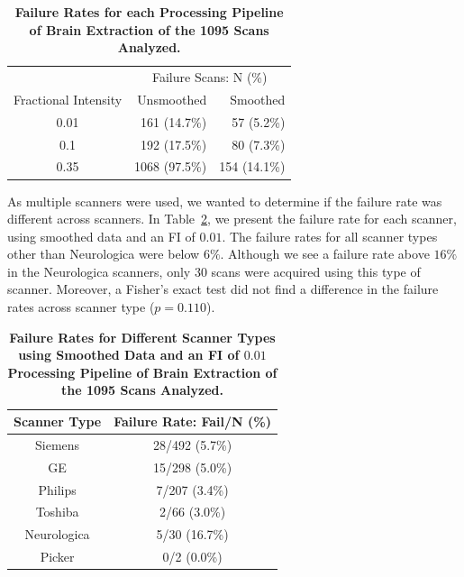 \documentclass{elsarticle}\usepackage[]{graphicx}\usepackage[]{color}
\begin{document}
\begin{table}[ht]
\centering
\begin{tabular}{cr|r}
  \hline & \multicolumn{2}{c}{Failure Scans: N (\%)} \\Fractional Intensity & Unsmoothed & Smoothed \\ 
  \hline
0.01 & 161 (14.7\%) & 57 (5.2\%) \\ 
  0.1 & 192 (17.5\%) & 80 (7.3\%) \\ 
  0.35 & 1068 (97.5\%) & 154 (14.1\%) \\ 
   \hline
\end{tabular}
\caption{{\bf Failure Rates for each Processing Pipeline of Brain Extraction of the 1095 Scans Analyzed.}} 
\label{tab:fail}
\end{table}


As multiple scanners were used, we wanted to determine if the failure rate was different across scanners.  In Table~\ref{tab:sfail}, we present the failure rate for each scanner, using smoothed data and an FI of $0.01$.  The failure rates for all scanner types other than Neurologica were below $6\%$.  Although we see a failure rate above $16\%$ in the Neurologica scanners, only $30$ scans were acquired using this type of scanner.  Moreover, a Fisher's exact test did not find a difference in the failure rates across scanner type ($p=0.110$).

\begin{table}[ht]
\centering
\begin{tabular}{cc}
 Scanner Type & Failure Rate: Fail/N (\%) \\ 
  \hline
Siemens & 28/492 (5.7\%) \\ 
  GE & 15/298 (5.0\%) \\ 
  Philips & 7/207 (3.4\%) \\ 
  Toshiba & 2/66 (3.0\%) \\ 
  Neurologica & 5/30 (16.7\%) \\ 
  Picker & 0/2 (0.0\%) \\ 
   \hline
\end{tabular}
\caption{{\bf Failure Rates for Different Scanner Types using Smoothed Data and an FI of $0.01$ Processing Pipeline of Brain Extraction of the 1095 Scans Analyzed.}} 
\label{tab:sfail}
\end{table}
\end{document}
